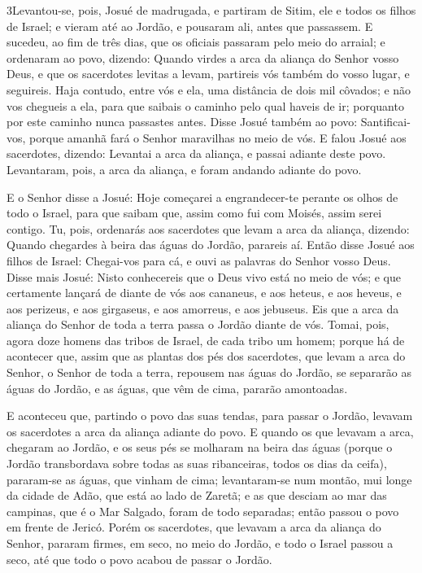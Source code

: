 \medskip

\lettrine{3} Levantou-se, pois, Josué de madrugada, e partiram
de Sitim, ele e todos os filhos de Israel; e vieram até ao Jordão, e
pousaram ali, antes que passassem. E sucedeu, ao fim de três
dias, que os oficiais passaram pelo meio do arraial; e ordenaram
ao povo, dizendo: Quando virdes a arca da aliança do Senhor vosso
Deus, e que os sacerdotes levitas a levam, partireis vós também do
vosso lugar, e seguireis. Haja contudo, entre vós e ela, uma
distância de dois mil côvados; e não vos chegueis a ela, para que
saibais o caminho pelo qual haveis de ir; porquanto por este caminho
nunca passastes antes. Disse Josué também ao povo:
Santificai-vos, porque amanhã fará o Senhor maravilhas no meio de
vós. E falou Josué aos sacerdotes, dizendo: Levantai a arca da
aliança, e passai adiante deste povo. Levantaram, pois, a arca da
aliança, e foram andando adiante do povo.

E o Senhor disse a Josué: Hoje começarei a engrandecer-te perante
os olhos de todo o Israel, para que saibam que, assim como fui com
Moisés, assim serei contigo. Tu, pois, ordenarás aos sacerdotes
que levam a arca da aliança, dizendo: Quando chegardes à beira das
águas do Jordão, parareis aí. Então disse Josué aos filhos de
Israel: Chegai-vos para cá, e ouvi as palavras do Senhor vosso Deus.
Disse mais Josué: Nisto conhecereis que o Deus vivo está no
meio de vós; e que certamente lançará de diante de vós aos cananeus,
e aos heteus, e aos heveus, e aos perizeus, e aos girgaseus, e aos
amorreus, e aos jebuseus. Eis que a arca da aliança do Senhor
de toda a terra passa o Jordão diante de vós. Tomai, pois,
agora doze homens das tribos de Israel, de cada tribo um homem;
porque há de acontecer que, assim que as plantas dos pés dos
sacerdotes, que levam a arca do Senhor, o Senhor de toda a terra,
repousem nas águas do Jordão, se separarão as águas do Jordão, e as
águas, que vêm de cima, pararão amontoadas.

E aconteceu que, partindo o povo das suas tendas, para passar o
Jordão, levavam os sacerdotes a arca da aliança adiante do povo.
E quando os que levavam a arca, chegaram ao Jordão, e os seus
pés se molharam na beira das águas (porque o Jordão transbordava
sobre todas as suas ribanceiras, todos os dias da ceifa),
pararam-se as águas, que vinham de cima; levantaram-se num
montão, mui longe da cidade de Adão, que está ao lado de Zaretã; e
as que desciam ao mar das campinas, que é o Mar Salgado, foram de
todo separadas; então passou o povo em frente de Jericó.
Porém os sacerdotes, que levavam a arca da aliança do Senhor,
pararam firmes, em seco, no meio do Jordão, e todo o Israel passou a
seco, até que todo o povo acabou de passar o Jordão.

